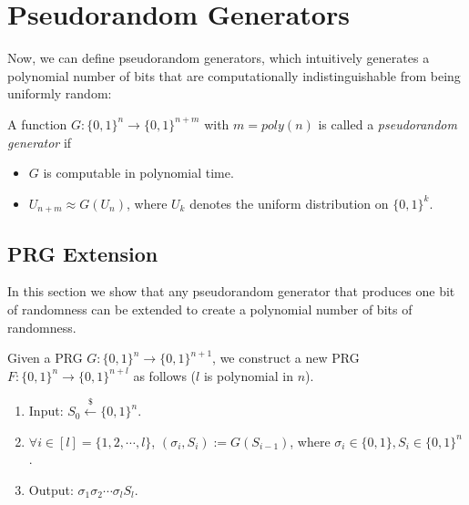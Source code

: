 %
%
%
%
%
%
%
\fi

\section{Pseudorandom Generators}
Now, we can define pseudorandom generators, which intuitively generates a polynomial number of bits that are computationally indistinguishable from being uniformly random:
\begin{definition}
A function $G:\{0,1\}^n\rightarrow \{0,1\}^{n+m}$ with $m = poly(n)$ is called a \emph{pseudorandom generator} if
\begin{itemize}
\item $G$ is computable in polynomial time.
\item $U_{n+m}\approx G(U_n)$, where $U_k$ denotes the uniform distribution on $\{0,1\}^k$.
\end{itemize}
\end{definition}


\subsection{PRG Extension}
In this section we show that any pseudorandom generator that produces one bit of randomness can be extended to create a polynomial number of bits of randomness.

\begin{construction}
Given a PRG $G: \{0, 1\}^n \rightarrow \{0, 1\} ^ {n+1}$,
we construct a new PRG $F: \{0, 1\}^n \rightarrow \{0, 1\} ^{n+l}$ as follows ($l$ is polynomial in $n$).
\begin{enumerate}[label=(\alph*)]
    \item Input: $S_0 \xleftarrow{\$} \{0, 1\}^n$.
    \item $\forall i \in [l] = \{1, 2, \cdots, l\}$, $(\sigma_i, S_i) := G(S_{i-1})$, where $\sigma_i \in \{0, 1\}, S_i \in \{0, 1\}^n$ .
    \item Output: $\sigma_1 \sigma_2 \cdots \sigma_l S_l$.
\end{enumerate}
\end{construction}


